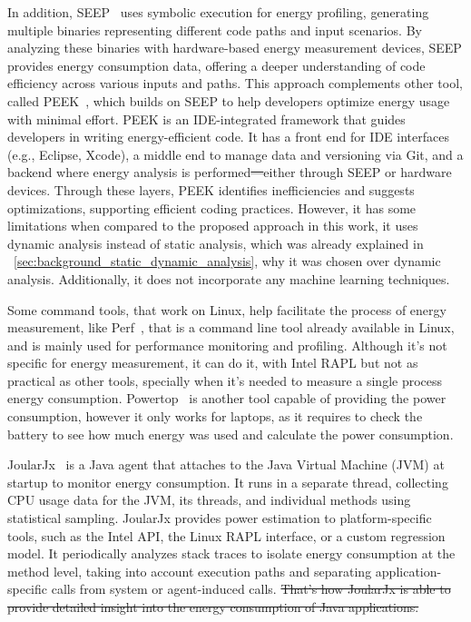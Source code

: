 In addition, SEEP~\cite{10.1145/2094091.2094106} uses symbolic execution for energy profiling, generating multiple binaries representing different code paths and input scenarios. By analyzing these binaries with hardware-based energy measurement devices, SEEP provides energy consumption data, offering a deeper understanding of code efficiency across various inputs and paths. This approach complements other tool, called PEEK~\cite{187026}, which builds on SEEP to help developers optimize energy usage with minimal effort. PEEK is an IDE-integrated framework that guides developers in writing energy-efficient code. It has a front end for IDE interfaces (e.g., Eclipse, Xcode), a middle end to manage data and versioning via Git, and a backend where energy analysis is performed\st{—}either through SEEP or hardware devices. Through these layers, PEEK identifies inefficiencies and suggests optimizations, supporting efficient coding practices. However, it has some limitations when compared to the proposed approach in this work, it uses dynamic analysis instead of static analysis, which was already explained in ~\ref{sec:background_static_dynamic_analysis}, why it was chosen over dynamic analysis. Additionally, it does not incorporate any machine learning techniques.

Some command tools, that work on Linux, help facilitate the process of energy measurement, like Perf~\cite{perfwiki_main}, that is a command line tool already available in Linux, and is mainly used for performance monitoring and profiling. Although it's not specific for energy measurement, it can do it, with Intel RAPL but not as practical as other tools, specially when it's needed to measure a single process energy consumption. Powertop~\cite{archlinux_Powertop} is another tool capable of providing the power consumption, however it only works for laptops, as it requires to check the battery to see how much energy was used and calculate the power consumption.

JoularJx~\cite{noureddine-ie-2022} is a Java agent that attaches to the Java Virtual Machine (JVM) at startup to monitor energy consumption. It runs in a separate thread, collecting CPU usage data for the JVM, its threads, and individual methods using statistical sampling. JoularJx provides power estimation to platform-specific tools, such as the Intel API, the Linux RAPL interface, or a custom regression model. It periodically analyzes stack traces to isolate energy consumption at the method level, taking into account execution paths and separating application-specific calls from system or agent-induced calls. \st{That's how JoularJx is able to provide detailed insight into the energy consumption of Java applications.}

